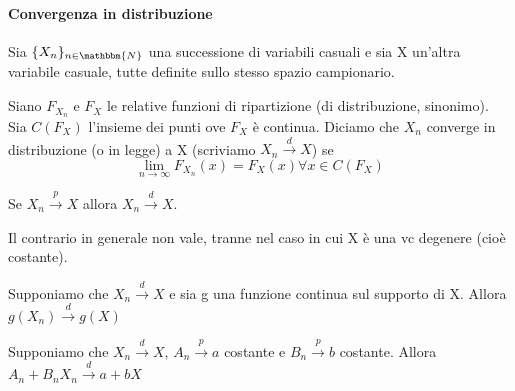 \paragraph{Convergenza in distribuzione}
\begin{definizione}

Sia $\{X_n\}_{n\in\mathbbm{N}}$ una successione di variabili casuali e 
sia X un'altra variabile casuale, tutte definite sullo stesso spazio campionario.

Siano $F_{X_n}$ e $F_X$ le relative funzioni di ripartizione (di distribuzione, sinonimo).
Sia $C(F_X)$ l'insieme dei punti ove $F_X$ è continua. 
Diciamo che $X_n$ converge in distribuzione (o in legge) a X (scriviamo $X_n\stackrel{d}{\rightarrow}X$) se 
$$\lim_{n \rightarrow\infty} F_{X_n}(x)=F_X(x) \forall x \in C(F_X)$$
\end{definizione}

\begin{teo}
Se $X_n\stackrel{p}{\rightarrow}X$ allora $X_n\stackrel{d}{\rightarrow}X$.
\end{teo}
\begin{oss}
Il contrario in generale non vale, tranne nel caso in cui X è una vc degenere (cioè costante).
\end{oss}
\begin{teo} Supponiamo che $X_n\stackrel{d}{\rightarrow}X$ e sia g una funzione continua sul supporto di X. Allora $g(X_n)\stackrel{d}{\rightarrow}g(X)$
\end{teo}
\begin{teo} [Slutsky] Supponiamo che $X_n\stackrel{d}{\rightarrow}X$, $A_n\stackrel{p}{\rightarrow}a$ costante e $B_n\stackrel{p}{\rightarrow}b$ costante. Allora $A_n+B_n X_n\stackrel{d}{\rightarrow}a+bX$
\end{teo}
